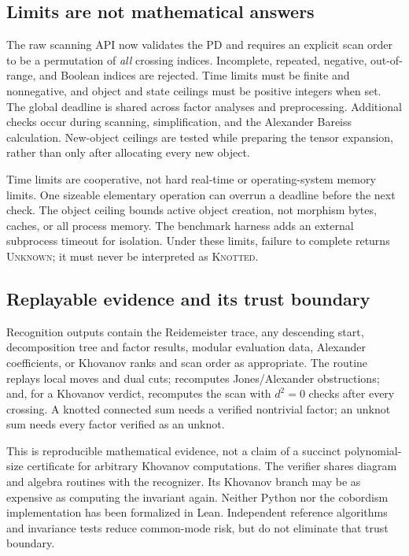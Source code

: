 \documentclass[11pt,a4paper]{article}
\theoremstyle{definition}\newtheorem{remark}[theorem]{Remark}
\newcommand{\Knotted}{\textsc{Knotted}}
\newcommand{\Unknown}{\textsc{Unknown}}
\begin{document}
\subsection{Limits are not mathematical answers}
The raw scanning API now validates the PD and requires an explicit scan order to
be a permutation of \emph{all} crossing indices. Incomplete, repeated, negative,
out-of-range, and Boolean indices are rejected. Time limits must be finite and
nonnegative, and object and state ceilings must be positive integers when set.
The global deadline is shared across factor analyses and preprocessing.
Additional checks occur during scanning, simplification, and the Alexander
Bareiss calculation. New-object ceilings are tested while preparing the tensor
expansion, rather than only after allocating every new object.

Time limits are cooperative, not hard real-time or operating-system memory
limits. One sizeable elementary operation can overrun a deadline before the
next check. The object ceiling bounds active object creation, not morphism
bytes, caches, or all process memory. The benchmark harness adds an external
subprocess timeout for isolation. Under these limits, failure to complete returns
\Unknown; it must never be interpreted as \Knotted.

\subsection{Replayable evidence and its trust boundary}
Recognition outputs contain the Reidemeister trace, any descending start,
decomposition tree and factor results, modular evaluation data, Alexander
coefficients, or Khovanov ranks and scan order as appropriate. The
 routine replays local moves and dual cuts; recomputes
Jones/Alexander obstructions; and, for a Khovanov verdict, recomputes the scan
with $d^2=0$ checks after every crossing. A knotted connected sum needs a verified
nontrivial factor; an unknot sum needs every factor verified as an unknot.

This is reproducible mathematical evidence, not a claim of a succinct
polynomial-size certificate for arbitrary Khovanov computations. The verifier
shares diagram and algebra routines with the recognizer. Its Khovanov branch
may be as expensive as computing the invariant again. Neither Python nor the
cobordism implementation has been formalized in Lean. Independent reference
algorithms and invariance tests reduce common-mode risk, but do not eliminate
that trust boundary.
\end{document}
